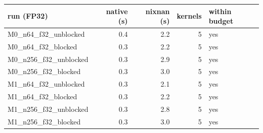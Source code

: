 \begin{tabular}{lrrrl}
\toprule
run (FP32) & native (s) & nixnan (s) & kernels & within budget\\
\midrule
M0\_n64\_f32\_unblocked & 0.4 & 2.2 & 5 & yes\\
M0\_n64\_f32\_blocked & 0.3 & 2.2 & 5 & yes\\
M0\_n256\_f32\_unblocked & 0.3 & 2.9 & 5 & yes\\
M0\_n256\_f32\_blocked & 0.3 & 3.0 & 5 & yes\\
M1\_n64\_f32\_unblocked & 0.3 & 2.1 & 5 & yes\\
M1\_n64\_f32\_blocked & 0.3 & 2.2 & 5 & yes\\
M1\_n256\_f32\_unblocked & 0.3 & 2.8 & 5 & yes\\
M1\_n256\_f32\_blocked & 0.3 & 3.0 & 5 & yes\\
\bottomrule
\end{tabular}
